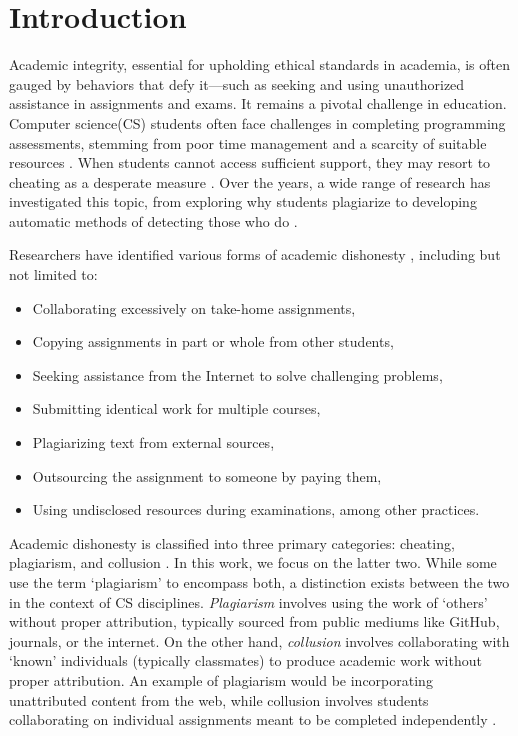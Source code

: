 \section{Introduction} \label{sec:intro}

Academic integrity, essential for upholding ethical standards in academia, is often gauged by behaviors that defy it—such as seeking and using unauthorized assistance in assignments and exams. It remains a pivotal challenge in education. Computer science(CS) students often face challenges in completing programming assessments, stemming from poor time management and a scarcity of suitable resources \cite{10.5555/858403.858418}. When students cannot access sufficient support, they may resort to cheating as a desperate measure \cite{10.1145/3059009.3059065, 10.1145/1632149.1632168}. Over the years, a wide range of research has investigated this topic, from exploring why students plagiarize to developing automatic methods of detecting those who do \cite{10.5120/ijca2015906113}.

Researchers have identified various forms of academic dishonesty \cite{40db574cf24f441d994cbb1cd909bd1f}, including but not limited to:

\begin{itemize}
    \item Collaborating excessively on take-home assignments,
    \item Copying assignments in part or whole from other students,
    \item Seeking assistance from the Internet to solve challenging problems,
    \item Submitting identical work for multiple courses,
    \item Plagiarizing text from external sources,
    \item Outsourcing the assignment to someone by paying them,
    \item Using undisclosed resources during examinations, among other practices.
\end{itemize} 

Academic dishonesty is classified into three primary categories: cheating, plagiarism, and collusion \cite{8937362}. In this work, we focus on the latter two. While some use the term `plagiarism' to encompass both, a distinction exists between the two in the context of CS disciplines. \textit{Plagiarism} involves using the work of `others' without proper attribution, typically sourced from public mediums like GitHub, journals, or the internet. On the other hand, \textit{collusion} involves collaborating with `known' individuals (typically classmates) to produce academic work without proper attribution. An example of plagiarism would be incorporating unattributed content from the web, while collusion involves students collaborating on individual assignments meant to be completed independently \cite{Owunwanne, Fraser2014CollaborationCA,JonesJuliet}.


